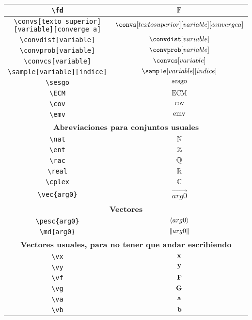 \begin{longtable}{|c|c|}
\verb|\fd| & $\displaystyle\mathbb{F}$ \\ \hline 
\verb|\convs[texto superior][variable][converge a]| & $\displaystyle\convs[texto superior][variable][converge a]$ \\ \hline 
\verb|\convdist[variable]| & $\displaystyle\convdist[variable]$ \\ \hline 
\verb|\convprob[variable]| & $\displaystyle\convprob[variable]$ \\ \hline 
\verb|\convcs[variable]| & $\displaystyle\convcs[variable]$ \\ \hline 
\verb|\sample[variable][indice]| & $\displaystyle\sample[variable][indice]$ \\ \hline 
\verb|\sesgo| & $\displaystyle\operatorname{sesgo}$ \\ \hline 
\verb|\ECM| & $\displaystyle\operatorname{ECM}$ \\ \hline 
\verb|\cov| & $\displaystyle\operatorname{cov}$ \\ \hline 
\verb|\emv| & $\displaystyle\operatorname{emv}$ \\ \hline 
\multicolumn{2}{|c|}{\textbf{Abreviaciones para conjuntos usuales}} \\ \hline 
\verb|\nat| & $\displaystyle\mathbb{N}$ \\ \hline 
\verb|\ent| & $\displaystyle\mathbb{Z}$ \\ \hline 
\verb|\rac| & $\displaystyle\mathbb{Q}$ \\ \hline 
\verb|\real| & $\displaystyle\mathbb{R}$ \\ \hline 
\verb|\cplex| & $\displaystyle\mathbb{C}$ \\ \hline 
\verb|\vec{arg0}| & $\displaystyle\vec{arg0}$ \\ \hline 
\multicolumn{2}{|c|}{\textbf{Vectores}} \\ \hline 
\verb|\pesc{arg0}| & $\displaystyle\langle arg0 \rangle$ \\ \hline 
\verb|\md{arg0}| & $\displaystyle\| arg0 \|$ \\ \hline 
\multicolumn{2}{|c|}{\textbf{Vectores usuales, para no tener que andar escribiendo}} \\ \hline 
\verb|\vx| & $\displaystyle\bold{x}$ \\ \hline 
\verb|\vy| & $\displaystyle\bold{y}$ \\ \hline 
\verb|\vf| & $\displaystyle\bold{F}$ \\ \hline 
\verb|\vg| & $\displaystyle\bold{G}$ \\ \hline 
\verb|\va| & $\displaystyle\bold{a}$ \\ \hline 
\verb|\vb| & $\displaystyle\bold{b}$ \\ \hline 

\end{longtable}

